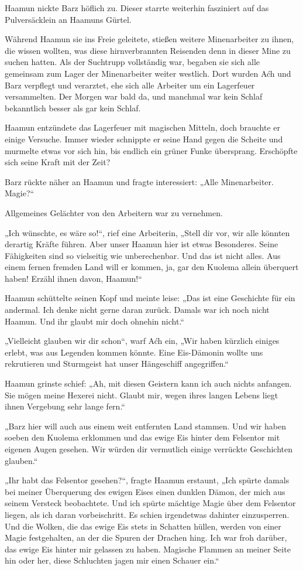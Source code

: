Haamun nickte Barz höflich zu. Dieser starrte weiterhin fasziniert auf das Pulversäcklein an Haamuns Gürtel.

Während Haamun sie ins Freie geleitete, stießen weitere Minenarbeiter zu ihnen, die wissen wollten, was diese hirnverbrannten Reisenden denn in dieser Mine zu suchen hatten. Als der Suchtrupp vollständig war, begaben sie sich alle gemeinsam zum Lager der Minenarbeiter weiter westlich. Dort wurden Aćh und Barz verpflegt und verarztet, ehe sich alle Arbeiter um ein Lagerfeuer versammelten. Der Morgen war bald da, und manchmal war kein Schlaf bekanntlich besser als gar kein Schlaf.

Haamun entzündete das Lagerfeuer mit magischen Mitteln, doch brauchte er einige Versuche. Immer wieder schnippte er seine Hand gegen die Scheite und murmelte etwas vor sich hin, bis endlich ein grüner Funke übersprang. Erschöpfte sich seine Kraft mit der Zeit?

Barz rückte näher an Haamun und fragte interessiert: „Alle Minenarbeiter. Magie?“

Allgemeines Gelächter von den Arbeitern war zu vernehmen.

„Ich wünschte, es wäre so!“, rief eine Arbeiterin, „Stell dir vor, wir alle könnten derartig Kräfte führen. Aber unser Haamun hier ist etwas Besonderes. Seine Fähigkeiten sind so vielseitig wie unberechenbar. Und das ist nicht alles. Aus einem fernen fremden Land will er kommen, ja, gar den Kuolema allein überquert haben! Erzähl ihnen davon, Haamun!“

Haamun schüttelte seinen Kopf und meinte leise: „Das ist eine Geschichte für ein andermal. Ich denke nicht gerne daran zurück. Damals war ich noch nicht Haamun. Und ihr glaubt mir doch ohnehin nicht.“

„Vielleicht glauben wir dir schon“, warf Aćh ein, „Wir haben kürzlich einiges erlebt, was aus Legenden kommen könnte. Eine Eis-Dämonin wollte uns rekrutieren und Sturmgeist hat unser Hängeschiff angegriffen.“

Haamun grinste schief: „Ah, mit diesen Geistern kann ich auch nichts anfangen. Sie mögen meine Hexerei nicht. Glaubt mir, wegen ihres langen Lebens liegt ihnen Vergebung sehr lange fern.“

„Barz hier will auch aus einem weit entfernten Land stammen. Und wir haben soeben den Kuolema erklommen und das ewige Eis hinter dem Felsentor mit eigenen Augen gesehen. Wir würden dir vermutlich einige verrückte Geschichten glauben.“

„Ihr habt das Felsentor gesehen?“, fragte Haamun erstaunt, „Ich spürte damals bei meiner Überquerung des ewigen Eises einen dunklen Dämon, der mich aus seinem Versteck beobachtete. Und ich spürte mächtige Magie über dem Felsentor liegen, als ich daran vorbeischritt. Es schien irgendetwas dahinter einzusperren. Und die Wolken, die das ewige Eis stets in Schatten hüllen, werden von einer Magie festgehalten, an der die Spuren der Drachen hing. Ich war froh darüber, das ewige Eis hinter mir gelassen zu haben. Magische Flammen an meiner Seite hin oder her, diese Schluchten jagen mir einen Schauer ein.“

